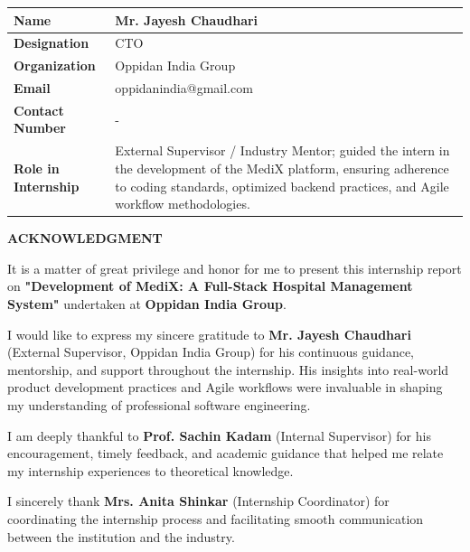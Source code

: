 \documentclass[12pt,a4paper]{article}
\begin{document}
\vspace{0.3in}
\begin{table}[h!]
\centering
\begin{tabular}{|p{5cm}|p{8cm}|}
\hline
\textbf{Name} & Mr. Jayesh Chaudhari \\
\hline
\textbf{Designation} & CTO{\hspace{6cm}} \\
\hline
\textbf{Organization} & Oppidan India Group \\
\hline
\textbf{Email} & oppidanindia@gmail.com{\hspace{6cm}} \\
\hline
\textbf{Contact Number} & -{\hspace{6cm}} \\
\hline
\textbf{Role in Internship} & External Supervisor / Industry Mentor; guided the intern in the development of the MediX platform, ensuring adherence to coding standards, optimized backend practices, and Agile workflow methodologies. \\
\hline
\end{tabular}
\end{table}

\newpage
\begin{center}
    {\Large\textbf{ACKNOWLEDGMENT}}
\end{center}
\vspace{0.5in}

\setlength{\parindent}{1.5em}
It is a matter of great privilege and honor for me to present this internship report on \textbf{"Development of MediX: A Full-Stack Hospital Management System"} undertaken at \textbf{Oppidan India Group}.

I would like to express my sincere gratitude to \textbf{Mr. Jayesh Chaudhari} (External Supervisor, Oppidan India Group) for his continuous guidance, mentorship, and support throughout the internship. His insights into real-world product development practices and Agile workflows were invaluable in shaping my understanding of professional software engineering.

I am deeply thankful to \textbf{Prof. Sachin Kadam} (Internal Supervisor) for his encouragement, timely feedback, and academic guidance that helped me relate my internship experiences to theoretical knowledge.

I sincerely thank \textbf{Mrs. Anita Shinkar} (Internship Coordinator) for coordinating the internship process and facilitating smooth communication between the institution and the industry.
\end{document}
